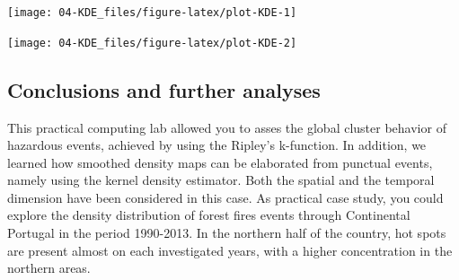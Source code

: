 \documentclass[
]{article}
\newenvironment{Shaded}{\begin{snugshade}}{\end{snugshade}}
\newcommand{\AttributeTok}[1]{\textcolor[rgb]{0.13,0.29,0.53}{#1}}
\newcommand{\CommentTok}[1]{\textcolor[rgb]{0.56,0.35,0.01}{\textit{#1}}}
\newcommand{\ControlFlowTok}[1]{\textcolor[rgb]{0.13,0.29,0.53}{\textbf{#1}}}
\newcommand{\DecValTok}[1]{\textcolor[rgb]{0.00,0.00,0.81}{#1}}
\newcommand{\FunctionTok}[1]{\textcolor[rgb]{0.13,0.29,0.53}{\textbf{#1}}}
\newcommand{\NormalTok}[1]{#1}
\newcommand{\OtherTok}[1]{\textcolor[rgb]{0.56,0.35,0.01}{#1}}
\newcommand{\SpecialCharTok}[1]{\textcolor[rgb]{0.81,0.36,0.00}{\textbf{#1}}}
\newcommand{\StringTok}[1]{\textcolor[rgb]{0.31,0.60,0.02}{#1}}
\begin{document}
\begin{center}\texttt{[image: 04-KDE\_files/figure-latex/plot-KDE-1]} \end{center}

\begin{Shaded}
\end{Shaded}

\begin{center}\texttt{[image: 04-KDE\_files/figure-latex/plot-KDE-2]} \end{center}

\subsection{Conclusions and further analyses}\label{conclusions-and-further-analyses-1}

This practical computing lab allowed you to asses the global cluster behavior of hazardous events, achieved by using the Ripley's k-function.
In addition, we learned how smoothed density maps can be elaborated from punctual events, namely using the kernel density estimator.
Both the spatial and the temporal dimension have been considered in this case.
As practical case study, you could explore the density distribution of forest fires events through Continental Portugal in the period 1990-2013.
In the northern half of the country, hot spots are present almost on each investigated years, with a higher concentration in the northern areas.
\end{document}
